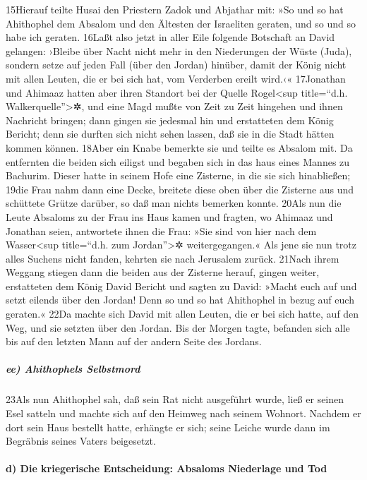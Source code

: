 15Hierauf teilte Husai den Priestern Zadok und Abjathar mit: »So und so
hat Ahithophel dem Absalom und den Ältesten der Israeliten geraten, und
so und so habe ich geraten. 16Laßt also jetzt in aller Eile folgende
Botschaft an David gelangen: ›Bleibe über Nacht nicht mehr in den
Niederungen der Wüste (Juda), sondern setze auf jeden Fall (über den
Jordan) hinüber, damit der König nicht mit allen Leuten, die er bei sich
hat, vom Verderben ereilt wird.‹« 17Jonathan und Ahimaaz hatten aber
ihren Standort bei der Quelle Rogel\textless sup title=``d.h.
Walkerquelle''\textgreater✲, und eine Magd mußte von Zeit zu Zeit
hingehen und ihnen Nachricht bringen; dann gingen sie jedesmal hin und
erstatteten dem König Bericht; denn sie durften sich nicht sehen lassen,
daß sie in die Stadt hätten kommen können. 18Aber ein Knabe bemerkte sie
und teilte es Absalom mit. Da entfernten die beiden sich eiligst und
begaben sich in das haus eines Mannes zu Bachurim. Dieser hatte in
seinem Hofe eine Zisterne, in die sie sich hinabließen; 19die Frau nahm
dann eine Decke, breitete diese oben über die Zisterne aus und schüttete
Grütze darüber, so daß man nichts bemerken konnte. 20Als nun die Leute
Absaloms zu der Frau ins Haus kamen und fragten, wo Ahimaaz und Jonathan
seien, antwortete ihnen die Frau: »Sie sind von hier nach dem
Wasser\textless sup title=``d.h. zum Jordan''\textgreater✲
weitergegangen.« Als jene sie nun trotz alles Suchens nicht fanden,
kehrten sie nach Jerusalem zurück. 21Nach ihrem Weggang stiegen dann die
beiden aus der Zisterne herauf, gingen weiter, erstatteten dem König
David Bericht und sagten zu David: »Macht euch auf und setzt eilends
über den Jordan! Denn so und so hat Ahithophel in bezug auf euch
geraten.« 22Da machte sich David mit allen Leuten, die er bei sich
hatte, auf den Weg, und sie setzten über den Jordan. Bis der Morgen
tagte, befanden sich alle bis auf den letzten Mann auf der andern Seite
des Jordans.

\hypertarget{ee-ahithophels-selbstmord}{%
\subparagraph{ee) Ahithophels
Selbstmord}\label{ee-ahithophels-selbstmord}}

23Als nun Ahithophel sah, daß sein Rat nicht ausgeführt wurde, ließ er
seinen Esel satteln und machte sich auf den Heimweg nach seinem Wohnort.
Nachdem er dort sein Haus bestellt hatte, erhängte er sich; seine Leiche
wurde dann im Begräbnis seines Vaters beigesetzt.

\hypertarget{d-die-kriegerische-entscheidung-absaloms-niederlage-und-tod}{%
\paragraph{d) Die kriegerische Entscheidung: Absaloms Niederlage und
Tod}\label{d-die-kriegerische-entscheidung-absaloms-niederlage-und-tod}}

